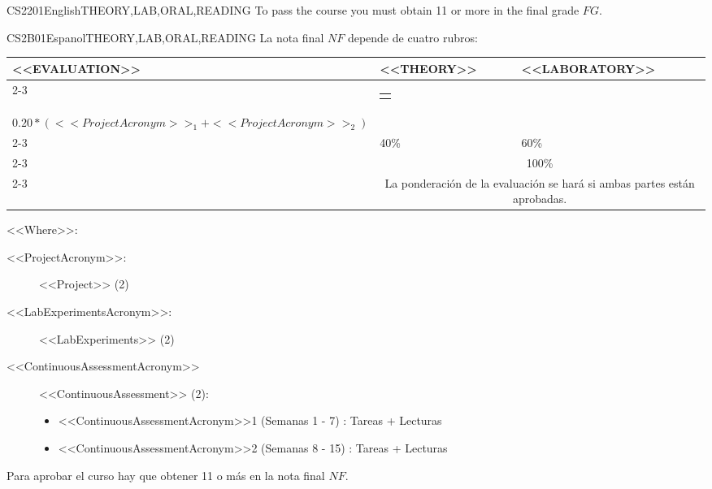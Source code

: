 \begin{evaluation}{CS2201}{English}{THEORY,LAB,ORAL,READING}
  \noindent To pass the course you must obtain 11 or more in the final grade $FG$.
  \end{evaluation}
 

  \begin{evaluation}{CS2B01}{Espanol}{THEORY,LAB,ORAL,READING}
  La nota final $NF$ depende de cuatro rubros:

  \begin{tabularx}{0.9\textwidth}{|X|p{}|p{}|} \hline
  \multirow{4}{*}{\uppercase{<<Evaluation>>}} & \uppercase{<<Theory>>} & \uppercase{<<Laboratory>>} \\ \cline{2-3}
  & %
      \begin{minipage}{0.95\textwidth}
      \begin{tabular}{l}
        $0.20*(<<ContinuousAssessmentAcronym>>_{1} + <<ContinuousAssessmentAcronym>>_{2})$ 
        \end{tabular} 
      \end{minipage} 
  & %
      \begin{minipage}{0.95\textwidth}
      \begin{tabular}{l}
        $0.10*(<<LabExperimentsAcronym>>_{2} + <<LabExperimentsAcronym>>_{3})$ + \\
        $0.20*(<<ProjectAcronym>>_{1} + <<ProjectAcronym>>_{2})$
      \end{tabular} 
      \end{minipage}                 \\ \cline{2-3}
  
  & %
  40\% 
  & %
  60\% \\ \cline{2-3}
  & \multicolumn{2}{|c|}{100\%} \\ \cline{2-3}
  & \multicolumn{2}{|c|}{La ponderación de la evaluación se hará si ambas partes están aprobadas.}  \\ \hline
  \end{tabularx}
    
  \vspace{2mm}
  \noindent <<Where>>:
  \begin{description}
    \item[<<ProjectAcronym>>:] <<Project>> (2)
    \item[<<LabExperimentsAcronym>>:] <<LabExperiments>> (2)
    \item[<<ContinuousAssessmentAcronym>>] <<ContinuousAssessment>> (2):
    \begin{itemize}
          \item <<ContinuousAssessmentAcronym>>1 (Semanas 1 - 7) : Tareas + Lecturas
          \item <<ContinuousAssessmentAcronym>>2 (Semanas 8 - 15) : Tareas + Lecturas
    \end{itemize}
  \end{description}
 
  \noindent Para aprobar el curso hay que obtener 11 o más en la nota final $NF$.
  \end{evaluation}
 
